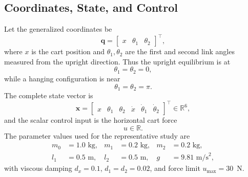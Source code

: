 \documentclass[conference]{IEEEtran}
\begin{document}
\subsection{Coordinates, State, and Control}
Let the generalized coordinates be
\begin{equation}
\bm{q} = \begin{bmatrix} x & \theta_1 & \theta_2 \end{bmatrix}^\top,
\end{equation}
where $x$ is the cart position and $\theta_1,\theta_2$ are the first and second link angles measured from the upright direction. Thus the upright equilibrium is at
\begin{equation}
\theta_1 = \theta_2 = 0,
\end{equation}
while a hanging configuration is near
\begin{equation}
\theta_1 = \theta_2 = \pi.
\end{equation}
The complete state vector is
\begin{equation}
\bm{x} = \begin{bmatrix} x & \theta_1 & \theta_2 & \dot{x} & \dot{\theta}_1 & \dot{\theta}_2 \end{bmatrix}^\top \in \mathbb{R}^6,
\end{equation}
and the scalar control input is the horizontal cart force
\begin{equation}
u \in \mathbb{R}.
\end{equation}
The parameter values used for the representative study are
\begin{align}
m_0 &= 1.0 \text{ kg}, &
m_1 &= 0.2 \text{ kg}, &
m_2 &= 0.2 \text{ kg}, \\
l_1 &= 0.5 \text{ m}, &
l_2 &= 0.5 \text{ m}, &
g &= 9.81 \text{ m/s}^2,
\end{align}
with viscous damping $d_x=0.1$, $d_1=d_2=0.02$, and force limit $u_{\max}=30$~N.
\end{document}
